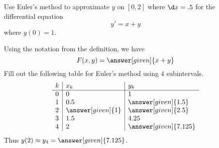 \documentclass{ximera}
\begin{document}
\begin{example}
Use Euler's method to approximate $y$ on $[0,2]$ where $\d x = .5$ for
the differential equation
\[
y'=x+y
\]
where $y(0) = 1$.
\begin{explanation}
Using the notation from the definition, we have
\[
F(x,y) = \answer[given]{x+y}
\]
Fill out the following table for Euler's method using $4$
subintervals.
\[
\begin{array}{l|l|l}
  k & x_k & y_k \\ \hline
  0 & 0   & 1 \\
  1 & 0.5 & \answer[given]{1.5} \\
  2 & \answer[given]{1} & \answer[given]{2.5}  \\
  3 & 1.5 & 4.25 \\
  4 & 2 & \answer[given]{7.125}
\end{array}
\]
Thus $y(2) \approx y_4 =\answer[given]{7.125}$.
\end{explanation}
\end{example}
\end{document}
